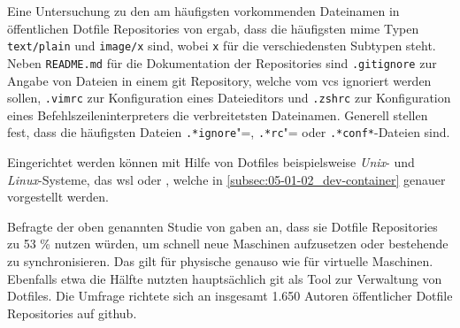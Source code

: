 Eine Untersuchung zu den am häufigsten vorkommenden Dateinamen in öffentlichen Dotfile Repositories von \citeauthor{029:Connecting-the-Dotfiles} ergab, dass die häufigsten \Gls{mime} Typen \texttt{text/plain} und \texttt{image/x} sind, wobei \texttt{x} für die verschiedensten Subtypen steht. Neben \texttt{README.md} für die Dokumentation der Repositories sind \texttt{.gitignore} zur Angabe von Dateien in einem \Gls{git} Repository, welche vom \Gls{vcs} ignoriert werden sollen, \texttt{.vimrc} zur Konfiguration eines Dateieditors und \texttt{.zshrc} zur Konfiguration eines Befehlszeileninterpreters die verbreitetsten Dateinamen. Generell stellen \citeauthor{029:Connecting-the-Dotfiles} fest, dass die häufigsten Dateien \texttt{.*ignore}"=, \texttt{.*rc}"= oder \texttt{.*conf*}-Dateien sind. \cite{029:Connecting-the-Dotfiles}

Eingerichtet werden können mit Hilfe von Dotfiles beispielsweise \textit{Unix}- und \textit{Linux}-Systeme, das \Gls{wsl} oder  \cite{203:Dev-Environment-as-a-Code-with-DevContainers-Dotfiles-and-GitHub-Codespaces}, welche in \autoref{subsec:05-01-02_dev-container} genauer vorgestellt werden.

Befragte der oben genannten Studie von \citeauthor{029:Connecting-the-Dotfiles} gaben an, dass sie Dotfile Repositories zu 53 \% nutzen würden, um schnell neue Maschinen aufzusetzen oder bestehende zu synchronisieren. Das gilt für physische genauso wie für virtuelle Maschinen. Ebenfalls etwa die Hälfte nutzten hauptsächlich \Gls{git} als Tool zur Verwaltung von Dotfiles. Die Umfrage richtete sich an insgesamt 1.650 Autoren öffentlicher Dotfile Repositories auf \Gls{github}. \cite{029:Connecting-the-Dotfiles}
